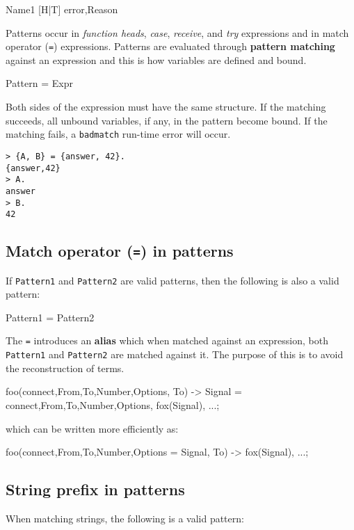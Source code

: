 \begin{erlang}
Name1
[H|T]
{error,Reason}
\end{erlang}

Patterns occur in \textit{function heads}, \textit{case},
\textit{receive}, and \textit{try} expressions and in match operator
(\texttt{=}) expressions. Patterns are evaluated through
\textbf{pattern matching} against an expression and this is how
variables are defined and bound.

\begin{erlang}
Pattern = Expr
\end{erlang}

Both sides of the expression must have the same structure. If the
matching succeeds, all unbound variables, if any, in the pattern
become bound. If the matching fails, a \texttt{badmatch} run-time
error will occur.


\begin{verbatim}
> {A, B} = {answer, 42}.
{answer,42}
> A.
answer
> B.
42
\end{verbatim}

\subsection{Match operator (\texttt{=}) in patterns}
If \texttt{Pattern1} and \texttt{Pattern2} are valid patterns, then
the following is also a valid pattern:

\begin{erlang}
Pattern1 = Pattern2
\end{erlang}

The \texttt{=} introduces an \textbf{alias} which when matched against an
expression, both \texttt{Pattern1} and \texttt{Pattern2} are matched
against it. The purpose of this is to avoid the reconstruction of terms.

\begin{erlang}
foo({connect,From,To,Number,Options}, To) ->
    Signal = {connect,From,To,Number,Options},
    fox(Signal),
    ...;
\end{erlang}

which can be written more efficiently as:

\begin{erlang}
foo({connect,From,To,Number,Options} = Signal, To) ->
    fox(Signal),
    ...;
\end{erlang}


\subsection{String prefix in patterns}
When matching strings, the following is a valid pattern:


